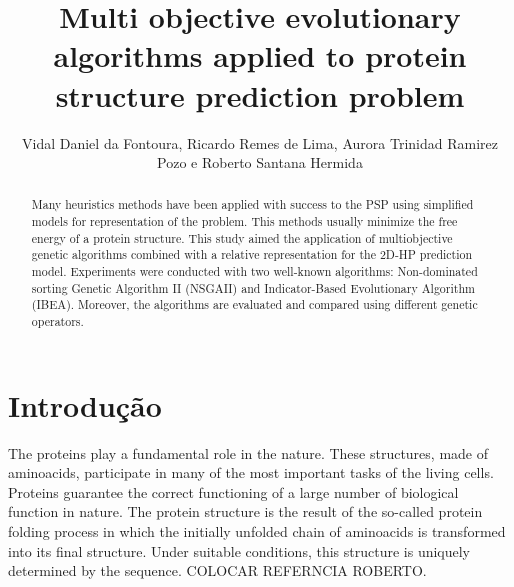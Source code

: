 \documentclass[conference]{IEEEtran}
\begin{document}
	
\title{Multi objective evolutionary algorithms applied to protein structure prediction problem}

\author{Vidal Daniel da Fontoura, Ricardo Remes de Lima, Aurora Trinidad Ramirez Pozo e Roberto Santana Hermida}



\maketitle

\begin{abstract}
Many heuristics methods have been applied with
success to the PSP using simplified models for representation of
the problem. This methods usually minimize the free energy of a
protein structure. This study aimed the application of multiobjective
genetic algorithms combined with a relative representation
for the 2D-HP prediction model. Experiments were conducted
with two well-known algorithms: Non-dominated sorting Genetic
Algorithm II (NSGAII) and Indicator-Based Evolutionary Algorithm
(IBEA). Moreover, the algorithms are evaluated and compared using different
genetic operators.

\end{abstract}





%
\IEEEpeerreviewmaketitle



\section{Introdução}

The proteins play a fundamental role in the nature. These structures, made of aminoacids, participate in many of the most important tasks of the living cells. Proteins guarantee the correct functioning of a large number of biological function in nature. The protein structure is the result of the so-called protein folding process in which the initially unfolded chain of aminoacids is transformed into its final structure. Under suitable
conditions, this structure is uniquely determined by the sequence. COLOCAR REFERNCIA ROBERTO.
\end{document}
